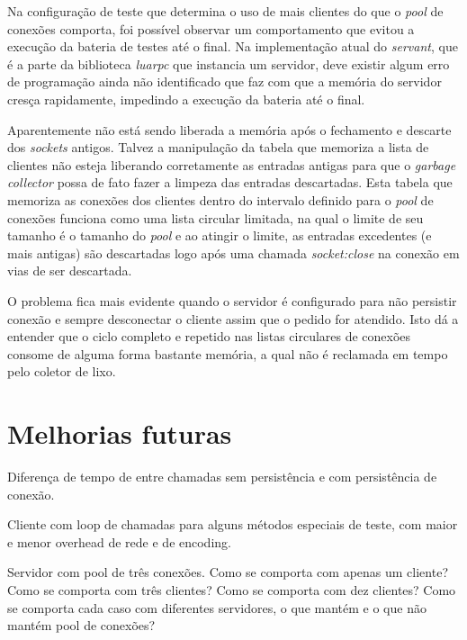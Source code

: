\documentclass[11pt]{article}
\begin{document}
Na configuração de teste que determina o uso de mais clientes do que o
\textit{pool} de conexões comporta, foi possível observar um comportamento que
evitou a execução da bateria de testes até o final. Na implementação atual do
\textit{servant}, que é a parte da biblioteca \textit{luarpc} que instancia
um servidor, deve existir algum erro de programação ainda não identificado que
faz com que a memória do servidor cresça rapidamente, impedindo a execução da
bateria até o final.

Aparentemente não está sendo liberada a memória após o
fechamento e descarte dos \textit{sockets} antigos. Talvez a manipulação da
tabela que memoriza a lista de clientes não esteja liberando corretamente as
entradas antigas para que o \textit{garbage collector} possa de fato fazer a
limpeza das entradas descartadas. Esta tabela que memoriza as conexões dos
clientes dentro do intervalo definido para o \textit{pool} de conexões funciona
como uma lista circular limitada, na qual o limite de seu tamanho é o tamanho do
\textit{pool} e ao atingir o limite, as entradas excedentes (e mais antigas) são
descartadas logo após uma chamada \textit{socket:close} na conexão em vias de
ser descartada.

O problema fica mais evidente quando o servidor é configurado para não persistir
conexão e sempre desconectar o cliente assim que o pedido for atendido. Isto dá
a entender que o ciclo completo e repetido nas listas circulares de conexões
consome de alguma forma bastante memória, a qual não é reclamada em tempo pelo
coletor de lixo.

\section{Melhorias futuras}\label{sec:future}












Diferença de tempo de entre chamadas sem persistência e com persistência de
conexão.

Cliente com loop de chamadas para alguns métodos especiais de teste, com maior
e menor overhead de rede e de encoding.

Servidor com pool de três conexões.
Como se comporta com apenas um cliente?
Como se comporta com três clientes?
Como se comporta com dez clientes?
Como se comporta cada caso com diferentes servidores, o que mantém e o que não
mantém pool de conexões?
\end{document}
